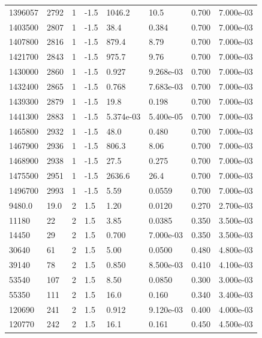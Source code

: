 \documentclass[preview]{standalone}
\begin{document}
{{{{{{{{{{{{{\begin{tabular}{L{1.2cm}C{1.2cm} C{0.3cm}C{0.5cm} C{1.4cm}C{1.4cm} C{1.4cm}C{1.4cm}}
  1396057  &  2792  & 1     & -1.5 &  1046.2  & 10.5  & 0.700 &  7.000e-03   \\ 
  1403500  &  2807  & 1     & -1.5 &  38.4  & 0.384  & 0.700 &  7.000e-03   \\ 
  1407800  &  2816  & 1     & -1.5 &  879.4  & 8.79  & 0.700 &  7.000e-03   \\ 
  1421700  &  2843  & 1     & -1.5 &  975.7  & 9.76  & 0.700 &  7.000e-03   \\ 
  1430000  &  2860  & 1     & -1.5 &  0.927  & 9.268e-03  & 0.700 &  7.000e-03   \\ 
  1432400  &  2865  & 1     & -1.5 &  0.768  & 7.683e-03  & 0.700 &  7.000e-03   \\ 
  1439300  &  2879  & 1     & -1.5 &  19.8  & 0.198  & 0.700 &  7.000e-03   \\ 
  1441300  &  2883  & 1     & -1.5 &  5.374e-03  & 5.400e-05  & 0.700 &  7.000e-03   \\ 
  1465800  &  2932  & 1     & -1.5 &  48.0  & 0.480  & 0.700 &  7.000e-03   \\ 
  1467900  &  2936  & 1     & -1.5 &  806.3  & 8.06  & 0.700 &  7.000e-03   \\ 
  1468900  &  2938  & 1     & -1.5 &  27.5  & 0.275  & 0.700 &  7.000e-03   \\ 
  1475500  &  2951  & 1     & -1.5 &  2636.6  & 26.4  & 0.700 &  7.000e-03   \\ 
  1496700  &  2993  & 1     & -1.5 &  5.59  & 0.0559  & 0.700 &  7.000e-03   \\ 
  9480.0  &  19.0  & 2     & 1.5 &  1.20  & 0.0120  & 0.270 &  2.700e-03   \\ 
  11180  &    22  & 2     & 1.5 &  3.85  & 0.0385  & 0.350 &  3.500e-03   \\ 
  14450  &    29  & 2     & 1.5 &  0.700  & 7.000e-03  & 0.350 &  3.500e-03   \\ 
  30640  &    61  & 2     & 1.5 &  5.00  & 0.0500  & 0.480 &  4.800e-03   \\ 
  39140  &    78  & 2     & 1.5 &  0.850  & 8.500e-03  & 0.410 &  4.100e-03   \\ 
  53540  &   107  & 2     & 1.5 &  8.50  & 0.0850  & 0.300 &  3.000e-03   \\ 
  55350  &   111  & 2     & 1.5 &  16.0  & 0.160  & 0.340 &  3.400e-03   \\ 
  120690  &   241  & 2     & 1.5 &  0.912  & 9.120e-03  & 0.400 &  4.000e-03   \\ 
  120770  &   242  & 2     & 1.5 &  16.1  & 0.161  & 0.450 &  4.500e-03   \\ 

\end{tabular}}}}}}}}}}}}}}
\end{document}
